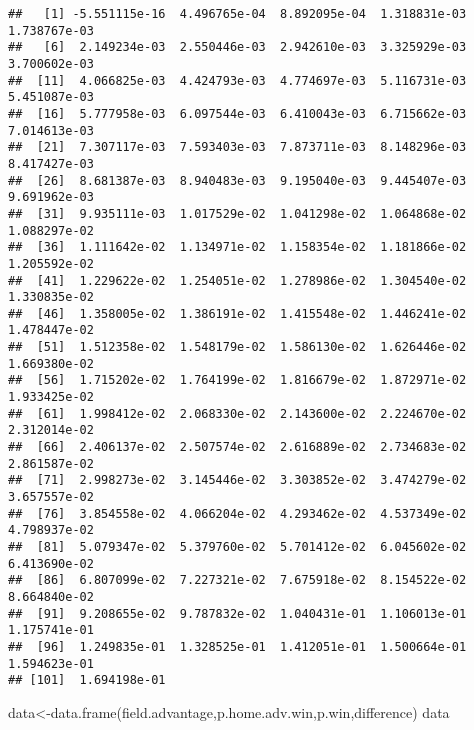 \documentclass[
]{article}
\newenvironment{Shaded}{\begin{snugshade}}{\end{snugshade}}
\newcommand{\FunctionTok}[1]{\textcolor[rgb]{0.00,0.00,0.00}{#1}}
\newcommand{\NormalTok}[1]{#1}
\newcommand{\OtherTok}[1]{\textcolor[rgb]{0.56,0.35,0.01}{#1}}
\begin{document}
\begin{verbatim}
##   [1] -5.551115e-16  4.496765e-04  8.892095e-04  1.318831e-03  1.738767e-03
##   [6]  2.149234e-03  2.550446e-03  2.942610e-03  3.325929e-03  3.700602e-03
##  [11]  4.066825e-03  4.424793e-03  4.774697e-03  5.116731e-03  5.451087e-03
##  [16]  5.777958e-03  6.097544e-03  6.410043e-03  6.715662e-03  7.014613e-03
##  [21]  7.307117e-03  7.593403e-03  7.873711e-03  8.148296e-03  8.417427e-03
##  [26]  8.681387e-03  8.940483e-03  9.195040e-03  9.445407e-03  9.691962e-03
##  [31]  9.935111e-03  1.017529e-02  1.041298e-02  1.064868e-02  1.088297e-02
##  [36]  1.111642e-02  1.134971e-02  1.158354e-02  1.181866e-02  1.205592e-02
##  [41]  1.229622e-02  1.254051e-02  1.278986e-02  1.304540e-02  1.330835e-02
##  [46]  1.358005e-02  1.386191e-02  1.415548e-02  1.446241e-02  1.478447e-02
##  [51]  1.512358e-02  1.548179e-02  1.586130e-02  1.626446e-02  1.669380e-02
##  [56]  1.715202e-02  1.764199e-02  1.816679e-02  1.872971e-02  1.933425e-02
##  [61]  1.998412e-02  2.068330e-02  2.143600e-02  2.224670e-02  2.312014e-02
##  [66]  2.406137e-02  2.507574e-02  2.616889e-02  2.734683e-02  2.861587e-02
##  [71]  2.998273e-02  3.145446e-02  3.303852e-02  3.474279e-02  3.657557e-02
##  [76]  3.854558e-02  4.066204e-02  4.293462e-02  4.537349e-02  4.798937e-02
##  [81]  5.079347e-02  5.379760e-02  5.701412e-02  6.045602e-02  6.413690e-02
##  [86]  6.807099e-02  7.227321e-02  7.675918e-02  8.154522e-02  8.664840e-02
##  [91]  9.208655e-02  9.787832e-02  1.040431e-01  1.106013e-01  1.175741e-01
##  [96]  1.249835e-01  1.328525e-01  1.412051e-01  1.500664e-01  1.594623e-01
## [101]  1.694198e-01
\end{verbatim}

\begin{Shaded}
\begin{Highlighting}[]
\NormalTok{data}\OtherTok{\textless{}{-}}\FunctionTok{data.frame}\NormalTok{(field.advantage,p.home.adv.win,p.win,difference)}
\NormalTok{data}
\end{Highlighting}
\end{Shaded}
\end{document}
